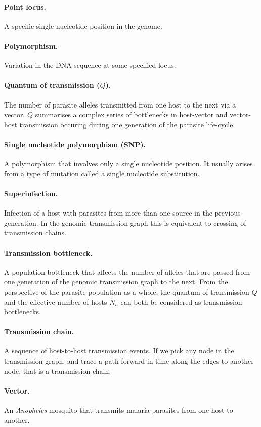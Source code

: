 \documentclass[_main.tex]{subfiles}
\begin{document}
\paragraph{Point locus.}  A specific single nucleotide position in the genome. 

\paragraph{Polymorphism.} Variation in the DNA sequence at some specified locus.

\paragraph{Quantum of transmission ($Q$).} The number of parasite alleles transmitted from one host to the next via a vector.  $Q$ summarises a complex series of bottlenecks in host-vector and vector-host transmission occuring during one generation of the parasite life-cycle.

\paragraph{Single nucleotide polymorphism (SNP).}  A polymorphism that involves only a single nucleotide position.  It usually arises from a type of mutation called a single nucleotide substitution.

\paragraph{Superinfection.}  Infection of a host with parasites from more than one source in the previous generation.  In the genomic transmission graph this is equivalent to crossing of transmission chains.

\paragraph{Transmission bottleneck.}  A population bottleneck that affects the number of alleles that are passed from one generation of the genomic transmission graph to the next.  From the perspective of the parasite population as a whole, the quantum of transmission $Q$ and the effective number of hosts $N_h$ can both be considered as transmission bottlenecks.

\paragraph{Transmission chain.}  A sequence of host-to-host transmission events.   If we pick any node in the transmission graph, and trace a path forward in time along the edges to another node, that is a transmission chain.

\paragraph{Vector.}  An \textit{Anopheles} mosquito that transmits malaria parasites from one host to another. 
\end{document}
